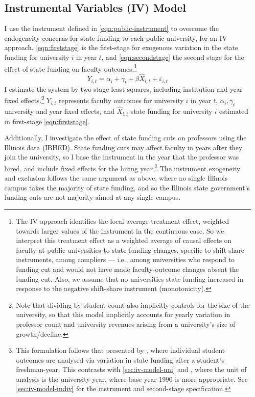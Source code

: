 \subsection{Instrumental Variables (IV) Model}
\label{sec:iv-model-uni}
I use the instrument defined in \autoref{eqn:public-instrument} to overcome the endogeneity concerns for state funding to each public university, for an IV approach.
\autoref{eqn:firststage} is the first-stage for exogenous variation in the state funding for university $i$ in year $t$, and \autoref{eqn:secondstage} the second stage for the effect of state funding on faculty outcomes.\footnote{
    The IV approach identifies the local average treatment effect, weighted towards larger values of the instrument in the continuous case.
    So we interpret this treatment effect as a weighted average of causal effects on faculty at public universities to state funding changes, specific to shift-share instruments, among compliers --- i.e., among universities who respond to funding cut and would not have made faculty-outcome changes absent the funding cut.
    Also, we assume that no universities state funding increased in response to the negative shift-share instrument (monotonicity).
}
\begin{equation}
    \label{eqn:secondstage}
    Y_{i,t} = \alpha_i + \gamma_t + \beta \widehat X_{i,t} + \varepsilon_{i,t}
\end{equation}
I estimate the system by two stage least squares, including institution and year fixed effects.\footnote{
    Note that dividing by student count also implicitly controls for the size of the university, so that this model implicitly accounts for yearly variation in professor count and university revenues arising from a university's size of growth/decline.
}
$Y_{i,t}$ represents faculty outcomes for university $i$ in year $t$, $\alpha_i, \gamma_t$ university and year fixed effects, and $\widehat X_{i,t}$ state funding for university $i$ estimated in first-stage \eqref{eqn:firststage}.

Additionally, I investigate the effect of state funding cuts on professors using the Illinois data (IBHED).
State funding cuts may affect faculty in years after they join the university, so I base the instrument in the year that the professor was hired, and include fixed effects for the hiring year.\footnote{
    This formulation follows that presented by \cite{NBERw27885}, where individual student outcomes are analysed via variation in state funding after a student's freshman-year.
    This contrasts with \autoref{sec:iv-model-uni} and \cite{NBERw23736}, where the unit of analysis is the university-year, where base year 1990 is more appropriate.
    See \autoref{sec:iv-model-indiv} for the instrument and second-stage specification.
}
The instrument exogeneity and exclusion follows the same argument as above, where no single Illinois campus takes the majority of state funding, and so
the Illinois state government's funding cuts are not majority aimed at any single campus.

